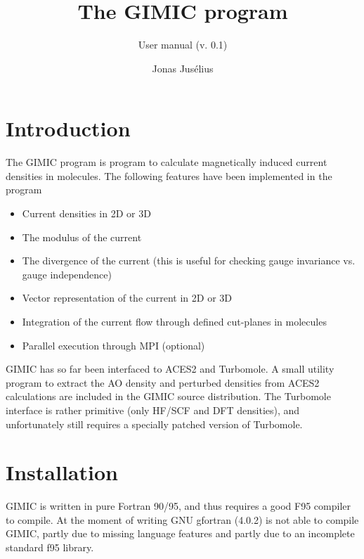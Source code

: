 \documentclass[a4paper,11pt]{article}
\begin{document}
\title{The GIMIC program}

\subtitle{User manual (v. 0.1)}
\author{{\sf Jonas Jus\'elius}}
\address{
{\sf University of Tromsø}\\
{\sf Department of Chemistry}\\
{\sf N-9037 Tromsø}
}
\maketitle

\section{Introduction}
The GIMIC program is program to calculate magnetically induced current
densities in molecules. The following features have been implemented in the
program
\begin{itemize}
  \item Current densities in 2D or 3D
  \item The modulus of the current 	
  \item The divergence of the current (this is useful for checking gauge
	invariance vs. gauge independence)
  \item Vector representation of the current in 2D or 3D
  \item Integration of the current flow through defined cut-planes in
	molecules
  \item Parallel execution through MPI (optional)
\end{itemize}

GIMIC has so far been interfaced to ACES2 and Turbomole. A small utility
program to extract the AO density and perturbed densities from ACES2
calculations are included in the GIMIC source distribution. The Turbomole
interface is rather primitive (only HF/SCF and DFT densities), and
unfortunately still requires a specially patched version of Turbomole.

\section{Installation}
GIMIC is written in pure Fortran 90/95, and thus requires a good F95 compiler
to compile. At the moment of writing GNU gfortran (4.0.2) is not able to
compile GIMIC, partly due to missing language features and partly due to
an incomplete standard f95 library.
\end{document}
